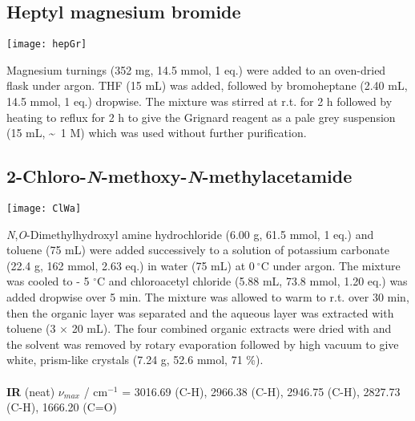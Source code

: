 {{{{{{\subsection{Heptyl magnesium bromide }


\begin{scheme}[H]
	\begin{center}
		\texttt{[image: hepGr]}
	\end{center}
\end{scheme}

Magnesium turnings (352 mg, 14.5 mmol, 1 eq.) were added to an oven-dried flask under argon. THF (15 mL) was added, followed by bromoheptane (2.40 mL, 14.5 mmol, 1 eq.) dropwise. The mixture was stirred at r.t. for 2 h followed by heating to reflux for 2 h to give the Grignard reagent as a pale grey suspension (15 mL, \textasciitilde ~1 M) which was used without further purification.

\subsection{2-Chloro-\textit{N}-methoxy-\textit{N}-methylacetamide }

\begin{scheme}[H]
	\begin{center}
		\texttt{[image: ClWa]}
	\end{center}
\end{scheme}


\textit{N},\textit{O}-Dimethylhydroxyl amine hydrochloride (6.00 g, 61.5 mmol, 1 eq.) and toluene (75 mL) were 
added successively to a solution of potassium carbonate (22.4 g, 162 mmol, 2.63 eq.) in water (75 mL) at $0\ ^{\circ}$C under argon. 
The mixture was cooled to - 5 $^{\circ}$C and chloroacetyl chloride (5.88 mL, 73.8 mmol, 1.20 eq.) was 
added dropwise over 5 min. The mixture was allowed to warm to r.t. over 30 min, 
then the organic layer was separated and the aqueous layer was extracted with toluene (3 $\times$ 20 mL). The 
four combined organic extracts were dried with  and the solvent was removed by rotary 
evaporation followed by high vacuum to give white, prism-like crystals (7.24 g, 52.6 mmol, 71 \%).
\\[1\baselineskip]
\\[1\baselineskip]
\textbf{IR} (neat) $\nu_{max}$ / cm$^{-1}$ = 
3016.69 (C-H),
2966.38 (C-H),
2946.75 (C-H),
2827.73 (C-H),
1666.20 (C=O)}
\\[1\baselineskip]
}}}}}
